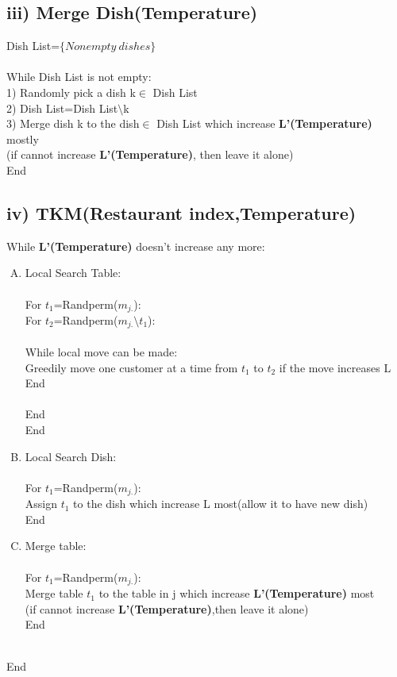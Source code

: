 \documentclass{article}
\begin{document}
\begin{spacing}{1.1}
\subsection{iii) Merge Dish(Temperature)}
 Dish List=$\{Nonempty \ dishes\}$\\ \\
 While Dish List is not empty:\\
 1) Randomly pick a dish k$\in$ Dish List\\
 2) Dish List=Dish List$\setminus$k\\
 3) Merge dish k to the dish$\in$ Dish List which increase {\bf L'(Temperature)} mostly\\(if cannot increase {\bf L'(Temperature)}, then leave it alone)\\
 End\\


\subsection{iv) TKM(Restaurant index,Temperature)}
While {\bf L'(Temperature)} doesn't increase any more:
\begin{enumerate}[(A)]
\item Local Search Table:\\ \\
For $t_{1}$=Randperm($m_{j.}$):\\
For $t_{2}$=Randperm($m_{j.}\setminus t_{1}$):\\ \\
While local move can be made:\\
Greedily move one customer at a time from $t_{1}$ to $t_{2}$ if the move increases L \\
End\\ \\
End\\End
\item Local Search Dish:\\ \\
For $t_{1}$=Randperm($m_{j.}$):\\
Assign $t_{1}$ to the dish which increase L most(allow it to have new dish)\\
End
\item Merge table:\\ \\
 For $t_{1}$=Randperm($m_{j.}$):\\
 Merge table $t_{1}$ to the table in j which increase {\bf L'(Temperature)} most\\(if cannot increase {\bf L'(Temperature)},then leave it alone)\\
 End\\ \\
\end{enumerate}  
End
\newpage

\end{spacing}
\end{document}
